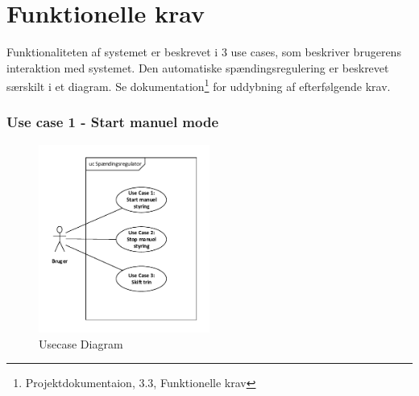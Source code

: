 
\section{Funktionelle krav}

Funktionaliteten af systemet er beskrevet i 3 use cases, som beskriver brugerens interaktion med systemet. Den automatiske spændingsregulering er beskrevet særskilt i et diagram. Se dokumentation\footnote{Projektdokumentaion, 3.3, Funktionelle krav} for uddybning af efterfølgende krav. 

\subsubsection{Use case 1 - Start manuel mode}

\begin{figure}[H] %
	\centering
	\includegraphics[width=0.5\textwidth]{Figure/UsecaseDiagram}
	\caption{Usecase Diagram}
	\label{fig:UsecaseDiagram}
\end{figure}